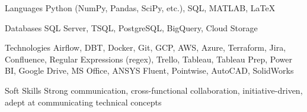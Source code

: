 
\begin{cvskills}
  \cvskill
    {Languages} %
    {Python (NumPy, Pandas, SciPy, etc.), SQL, MATLAB, LaTeX} %
  
  \cvskill
    {Databases} %
    {SQL Server, TSQL, PostgreSQL, BigQuery, Cloud Storage} %
    
  \cvskill
    {Technologies} %
    {Airflow, DBT, Docker, Git, GCP, AWS, Azure, Terraform, Jira, Confluence, Regular Expressions (regex), Trello, Tableau, Tableau Prep, Power BI, Google Drive, MS Office, ANSYS Fluent, Pointwise, AutoCAD, SolidWorks} %
    
  \cvskill
    {Soft Skills} %
    {Strong communication, cross-functional collaboration, initiative-driven, adept at communicating technical concepts}

\end{cvskills}
